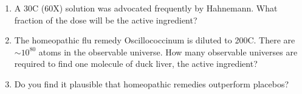 \documentclass[12pt]{article}
\begin{document}
\begin{enumerate}
\item A 30C (60X) solution was advocated frequently by Hahnemann.  What fraction of the dose will be the active ingredient?

\item The homeopathic flu remedy Oscillococcinum is diluted to 200C.  There are $\sim 10^{80}$ atoms in the observable universe. How many observable universes are required to find one molecule of duck liver, the active ingredient?

\item Do you find it plausible that homeopathic remedies outperform placebos?
\end{enumerate}
\ \\
\ \\


\end{document}
